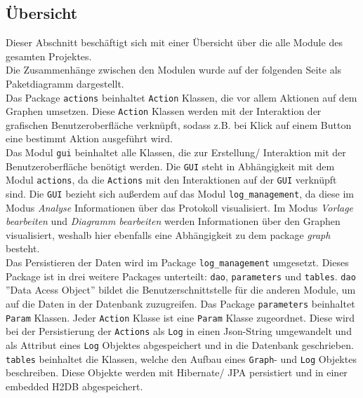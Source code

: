 \documentclass[enabledeprecatedfontcommands,fontsize=11pt,paper=a4,twoside]{scrartcl}
\newcounter{one}
\begin{document}
\newpage

\subsection{Übersicht}
Dieser Abschnitt beschäftigt sich mit einer Übersicht über die alle Module des gesamten Projektes. \\
Die Zusammenhänge zwischen den Modulen wurde auf der folgenden Seite als Paketdiagramm dargestellt. \\

Das Package \texttt{actions} beinhaltet \texttt{Action} Klassen, die vor allem Aktionen auf dem Graphen umsetzen. Diese \texttt{Action} Klassen werden mit der Interaktion der grafischen Benutzeroberfläche verknüpft, sodass z.B. bei Klick auf einem Button eine bestimmt Aktion ausgeführt wird. \\

Das Modul \texttt{gui} beinhaltet alle Klassen, die zur Erstellung/ Interaktion mit der Benutzeroberfläche benötigt werden. Die \texttt{GUI} steht in Abhängigkeit mit dem Modul \texttt{actions}, da die \texttt{Actions} mit den Interaktionen auf der \texttt{GUI} verknüpft sind. Die \texttt{GUI} bezieht sich außerdem auf das Modul \texttt{log\_management}, da diese im Modus \textit{Analyse} Informationen über das Protokoll visualisiert. Im Modus \textit{Vorlage bearbeiten} und \textit{Diagramm bearbeiten} werden Informationen über den Graphen visualisiert, weshalb hier ebenfalls eine Abhängigkeit zu dem package \textit{graph} besteht. \\

Das Persistieren der Daten wird im Package \texttt{log\_management} umgesetzt. Dieses Package ist in drei weitere Packages unterteilt: \texttt{dao}, \texttt{parameters} und \texttt{tables}. \texttt{dao} ''Data Acess Object'' bildet die Benutzerschnittstelle für die anderen Module, um auf die Daten in der Datenbank zuzugreifen. Das Package \texttt{parameters} beinhaltet \texttt{Param} Klassen. Jeder \texttt{Action} Klasse ist eine \texttt{Param} Klasse zugeordnet. Diese wird bei der Persistierung der \texttt{Actions} als \texttt{Log} in einen Json-String umgewandelt und als Attribut eines \texttt{Log} Objektes abgespeichert und in die Datenbank geschrieben. \texttt{tables} beinhaltet die Klassen, welche den Aufbau eines \texttt{Graph}- und \texttt{Log} Objektes beschreiben. Diese Objekte werden mit Hibernate/ JPA persistiert und in einer embedded H2DB abgespeichert. \\ 
\end{document}
